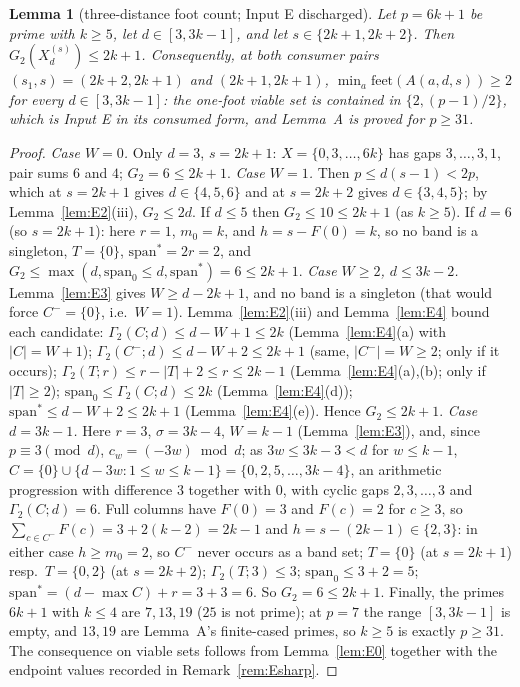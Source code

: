 \documentclass[11pt,a4paper]{article}
\numberwithin{equation}{section}
\theoremstyle{plain}
\newtheorem{lemma}[theorem]{Lemma}
\theoremstyle{definition}
\theoremstyle{remark}
\begin{document}
\begin{lemma}[three-distance foot count; Input E discharged]\label{lem:E}
Let $p=6k+1$ be prime with $k\ge5$, let $d\in[3,3k-1]$, and let
$s\in\{2k{+}1,2k{+}2\}$. Then $G_2(X^{(s)}_d)\le2k+1$. Consequently, at
both consumer pairs $(s_1,s)=(2k{+}2,2k{+}1)$ and $(2k{+}1,2k{+}1)$,
$\min_a\mathrm{feet}(A(a,d,s))\ge2$ for every $d\in[3,3k-1]$: the
one-foot viable set is contained in $\{2,(p-1)/2\}$, which is Input E
in its consumed form, and Lemma~A is proved for $p\ge31$.
\end{lemma}

\begin{proof}
\emph{Case $W=0$.} Only $d=3$, $s=2k{+}1$: $X=\{0,3,\dots,6k\}$ has
gaps $3,\dots,3,1$, pair sums $6$ and $4$; $G_2=6\le2k+1$.
\emph{Case $W=1$.} Then $p\le d(s-1)<2p$, which at $s=2k{+}1$ gives
$d\in\{4,5,6\}$ and at $s=2k{+}2$ gives $d\in\{3,4,5\}$; by
Lemma~\ref{lem:E2}(iii), $G_2\le2d$. If $d\le5$ then
$G_2\le10\le2k+1$ (as $k\ge5$). If $d=6$ (so $s=2k{+}1$): here $r=1$,
$m_0=k$, and $h=s-F(0)=k$, so no band is a singleton, $T=\{0\}$,
$\mathrm{span}^\ast=2r=2$, and $G_2\le\max(d,\mathrm{span}_0\le d,
\mathrm{span}^\ast)=6\le2k+1$.
\emph{Case $W\ge2$, $d\le3k-2$.} Lemma~\ref{lem:E3} gives
$W\ge d-2k+1$, and no band is a singleton (that would force
$C^-=\{0\}$, i.e.\ $W=1$). Lemma~\ref{lem:E2}(iii) and
Lemma~\ref{lem:E4} bound each candidate:
$\Gamma_2(C;d)\le d-W+1\le2k$ (Lemma~\ref{lem:E4}(a) with $|C|=W+1$);
$\Gamma_2(C^-;d)\le d-W+2\le2k+1$ (same, $|C^-|=W\ge2$; only if it
occurs); $\Gamma_2(T;r)\le r-|T|+2\le r\le2k-1$
(Lemma~\ref{lem:E4}(a),(b); only if $|T|\ge2$);
$\mathrm{span}_0\le\Gamma_2(C;d)\le2k$ (Lemma~\ref{lem:E4}(d));
$\mathrm{span}^\ast\le d-W+2\le2k+1$ (Lemma~\ref{lem:E4}(e)). Hence
$G_2\le2k+1$.
\emph{Case $d=3k-1$.} Here $r=3$, $\sigma=3k-4$, $W=k-1$
(Lemma~\ref{lem:E3}), and, since $p\equiv3\pmod d$,
$c_w=(-3w)\bmod d$; as $3w\le3k-3<d$ for $w\le k-1$,
$C=\{0\}\cup\{d-3w:1\le w\le k-1\}=\{0,2,5,\dots,3k-4\}$, an
arithmetic progression with difference $3$ together with $0$, with
cyclic gaps $2,3,\dots,3$ and $\Gamma_2(C;d)=6$. Full columns have
$F(0)=3$ and $F(c)=2$ for $c\ge3$, so
$\sum_{c\in C^-}F(c)=3+2(k-2)=2k-1$ and $h=s-(2k-1)\in\{2,3\}$: in
either case $h\ge m_0=2$, so $C^-$ never occurs as a band set;
$T=\{0\}$ (at $s=2k{+}1$) resp.\ $T=\{0,2\}$ (at $s=2k{+}2$);
$\Gamma_2(T;3)\le3$; $\mathrm{span}_0\le3+2=5$;
$\mathrm{span}^\ast=(d-\max C)+r=3+3=6$. So $G_2=6\le2k+1$.
Finally, the primes $6k+1$ with $k\le4$ are $7,13,19$ ($25$ is not
prime); at $p=7$ the range $[3,3k-1]$ is empty, and $13,19$ are
Lemma~A's finite-cased primes, so $k\ge5$ is exactly $p\ge31$. The
consequence on viable sets follows from Lemma~\ref{lem:E0} together
with the endpoint values recorded in Remark~\ref{rem:Esharp}.
\end{proof}
\end{document}
